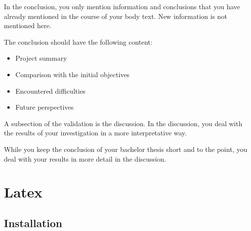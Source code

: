 \documentclass[a4paper,11pt,fleqn]{book}
\begin{document}
In the conclusion, you only mention information and conclusions that you have already mentioned in the course of your body text. New information is not mentioned here.

The conclusion should have the following content:
\begin{itemize}
  \item Project summary
  \item Comparison with the initial objectives
  \item Encountered difficulties
  \item Future perspectives
\end{itemize}

A subsection of the validation is the discussion. In the discussion, you deal with the results of your investigation in a more interpretative way.

While you keep the conclusion of your bachelor thesis short and to the point, you deal with your results in more detail in the discussion.

\chapter{Latex}
\minitoc\newpage

\section{Installation}
\end{document}
